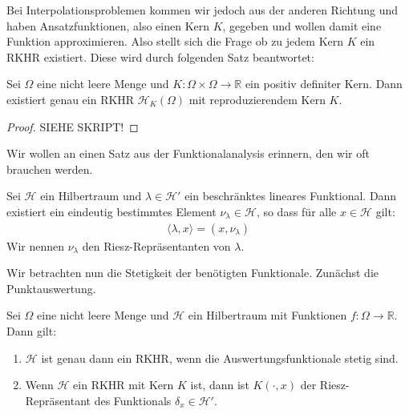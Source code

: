 Bei Interpolationsproblemen kommen wir jedoch aus der anderen Richtung und haben Ansatzfunktionen, also einen Kern $K$, gegeben und wollen damit eine Funktion approximieren. Also stellt sich die Frage ob zu jedem Kern $K$ ein \ac{RKHR} existiert. Diese wird durch folgenden Satz beantwortet:

\begin{theorem}
Sei $\Omega$ eine nicht leere Menge und $K:\Omega \times \Omega \rightarrow \mathbb{R}$ ein positiv definiter Kern. Dann existiert genau ein \ac{RKHR} $\mathcal{H}_K (\Omega)$ mit reproduzierendem Kern $K$.
\end{theorem}
\begin{proof}
SIEHE SKRIPT!
\end{proof}

Wir wollen an einen Satz aus der Funktionalanalysis erinnern, den wir oft brauchen werden.

\begin{theorem}
Sei $\mathcal{H}$ ein Hilbertraum und $\lambda \in \mathcal{H}'$ ein beschränktes lineares Funktional. Dann existiert ein eindeutig bestimmtes Element $\nu_\lambda \in \mathcal{H}$, so dass für alle $x \in \mathcal{H}$ gilt:
\begin{align*}
\langle \lambda, x \rangle = \left( x, \nu_\lambda \right)
\end{align*}
Wir nennen $\nu_\lambda$ den Riesz-Repräsentanten von $\lambda$.
\end{theorem}

Wir betrachten nun die Stetigkeit der benötigten Funktionale. Zunächst die Punktauswertung.

\begin{theorem}
\label{stetig}
Sei $\Omega$ eine nicht leere Menge und $\mathcal{H}$ ein Hilbertraum mit Funktionen $f: \Omega \rightarrow \mathbb{R}$. Dann gilt:
\begin{enumerate}
\item \label{stetig1} $\mathcal{H}$ ist genau dann ein \ac{RKHR}, wenn die Auswertungsfunktionale stetig sind.
\item \label{stetig2} Wenn $\mathcal{H}$ ein \ac{RKHR} mit Kern $K$ ist, dann ist $K(\cdot,x)$ der Riesz-Repräsentant des Funktionals $\delta_x \in \mathcal{H}'$.
\end{enumerate}
\end{theorem}

